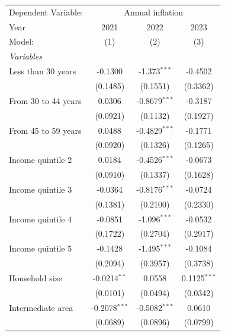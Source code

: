 
\begingroup
\centering
\begin{tabular}{lccc}
   \tabularnewline \midrule \midrule
   Dependent Variable: & \multicolumn{3}{c}{Annual inflation}\\
   Year                   & 2021            & 2022            & 2023 \\   
   Model:                 & (1)             & (2)             & (3)\\  
   \midrule
   \emph{Variables}\\
   Less than 30 years     & -0.1300         & -1.373$^{***}$  & -0.4502\\   
                          & (0.1485)        & (0.1551)        & (0.3362)\\   
   From 30 to 44 years    & 0.0306          & -0.8679$^{***}$ & -0.3187\\   
                          & (0.0921)        & (0.1132)        & (0.1927)\\   
   From 45 to 59 years    & 0.0488          & -0.4829$^{***}$ & -0.1771\\   
                          & (0.0920)        & (0.1326)        & (0.1265)\\   
   Income quintile 2      & 0.0184          & -0.4526$^{***}$ & -0.0673\\   
                          & (0.0910)        & (0.1337)        & (0.1628)\\   
   Income quintile 3      & -0.0364         & -0.8176$^{***}$ & -0.0724\\   
                          & (0.1381)        & (0.2100)        & (0.2330)\\   
   Income quintile 4      & -0.0851         & -1.096$^{***}$  & -0.0532\\   
                          & (0.1722)        & (0.2704)        & (0.2917)\\   
   Income quintile 5      & -0.1428         & -1.495$^{***}$  & -0.1084\\   
                          & (0.2094)        & (0.3957)        & (0.3738)\\   
   Household size         & -0.0214$^{**}$  & 0.0558          & 0.1125$^{***}$\\   
                          & (0.0101)        & (0.0494)        & (0.0342)\\   
   Intermediate area      & -0.2078$^{***}$ & -0.5082$^{***}$ & 0.0610\\   
                          & (0.0689)        & (0.0896)        & (0.0799)\\   

\end{tabular}
